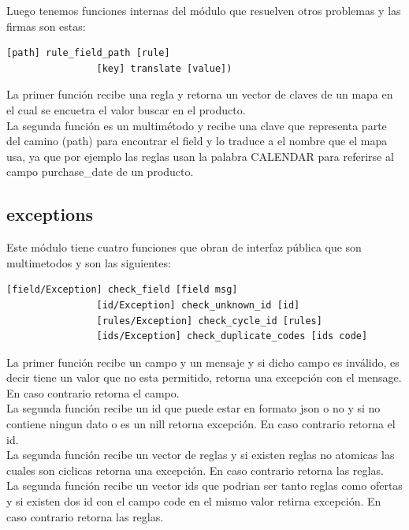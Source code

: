 \documentclass[a4paper, 12pt]{article}
\begin{document}
			Luego tenemos funciones internas del módulo que resuelven otros problemas y las firmas son estas:
			\begin{lstlisting}[frame=tb, caption=firmas de las funciones privadas, label=zebra, tabsize=1]
				[path] rule_field_path [rule]
				[key] translate [value])
			\end{lstlisting}
			La primer función recibe una regla y retorna un vector de claves de un mapa en el cual se encuetra el valor buscar en 				el producto.\\
			La segunda función es un multimétodo y recibe una clave que representa parte del camino (path) para encontrar el field 				y lo traduce a el nombre que el mapa usa, ya que por ejemplo las reglas usan la palabra CALENDAR para referirse al 				campo purchase\_date de un producto.

		\newpage
		\subsection{exceptions}
			Este módulo tiene cuatro funciones que obran de interfaz pública que son multimetodos y son las siguientes:
			\begin{lstlisting}[frame=tb, caption=firmas de la interfaz pública, label=zebra, tabsize=1]
				[field/Exception] check_field [field msg]
				[id/Exception] check_unknown_id [id]
				[rules/Exception] check_cycle_id [rules]
				[ids/Exception] check_duplicate_codes [ids code]
			\end{lstlisting}
			La primer función recibe un campo y un mensaje y si dicho campo es inválido, es decir tiene un valor que no esta 				permitido, retorna una excepción con el mensage. En caso contrario retorna el campo.\\
			La segunda función recibe un id que puede estar en formato json o no y si no contiene ningun dato o es un nill retorna 				excepción. En caso contrario retorna el id.\\
			La segunda función recibe un vector de reglas y si existen reglas no atomicas las cuales son ciclicas retorna una 				excepción. En caso contrario retorna las reglas.\\
			La segunda función recibe un vector ids que podrian ser tanto reglas como ofertas y si existen dos id con el campo code 			en el mismo valor retirna excepción. En caso contrario retorna las reglas.\\

		\newpage
\end{document}
